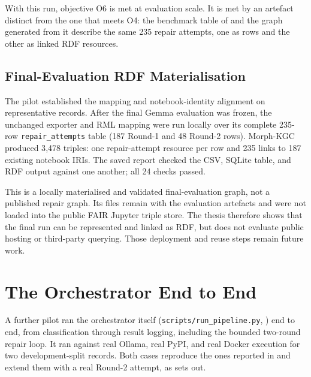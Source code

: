 With this run, objective O6 is met at evaluation scale. It is met by an
artefact distinct from the one that meets O4: the benchmark table of
 and the graph generated from it describe the
same 235 repair attempts, one as rows and the other as linked RDF
resources.

\fi

\subsection{Final-Evaluation RDF Materialisation}
\label{sec:v-i6-fullscale-current}
\label{sec:v-i6-fullscale}

The pilot established the mapping and notebook-identity alignment on
representative records. After the final Gemma evaluation was frozen, the
unchanged exporter and RML mapping were run locally over its complete 235-row
\texttt{repair\_attempts} table (187 Round-1 and 48 Round-2 rows). Morph-KGC
produced 3{,}478 triples: one repair-attempt resource per row and 235 links to
187 existing notebook IRIs. The saved report checked the CSV, SQLite table, and
RDF output against one another; all 24 checks passed.

This is a locally materialised and validated final-evaluation graph, not a
published repair graph. Its files remain with the evaluation artefacts and were
not loaded into the public FAIR Jupyter triple store. The thesis therefore
shows that the final run can be represented and linked as RDF, but does not
evaluate public hosting or third-party querying. Those deployment and reuse
steps remain future work.

\section{The Orchestrator End to End}
\label{sec:v-i7}

A further pilot ran the orchestrator itself
(\texttt{scripts/run\_pipeline.py}, ) end to end,
from classification through result logging, including the bounded
two-round repair loop. It ran against real Ollama, real PyPI, and real
Docker execution for two development-split records. Both cases reproduce
the ones reported in  and extend them with a real Round-2
attempt, as  sets out.

